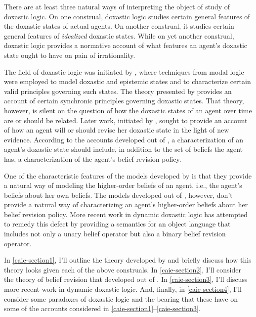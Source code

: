 

There are at least three natural ways of interpreting the object of study of doxastic logic.
On one construal, doxastic logic studies certain general features of the doxastic states of actual agents. 
On another construal, it studies certain general features of \textit{idealized} doxastic states.
While on yet another construal, doxastic logic provides a normative account of what features an agent's doxastic state ought to have on pain of irrationality.

The field of doxastic logic was initiated by \citet{Hintikka1}, where techniques from modal logic were employed to model  doxastic and epistemic states and to characterize certain valid principles governing such states.
The theory presented by \citeauthor{Hintikka1} provides an account of certain synchronic principles governing doxastic states.
That theory, however, is silent on the question of how the doxastic states of an agent over time are or should be related.
Later work, initiated by \citet{AGM}, sought to provide an account of how an agent will or should revise her doxastic state in the light of new evidence.
According to the accounts developed out of \citeauthor{AGM}, a characterization of an agent's doxastic state should include, in addition to the set of beliefs the agent has, a characterization of the agent's belief revision policy. 

One of the characteristic features of the models developed by \citeauthor{Hintikka1} is that they provide a natural way of modeling the higher-order beliefs of an agent, i.e., the agent's beliefs about her own beliefs.
The models developed out of \citeauthor{AGM}, however, don't provide a natural way of characterizing an agent's higher-order beliefs about her belief revision policy.
More recent work in dynamic doxastic logic has attempted to remedy this defect by providing a semantics for an object language that includes not only a unary belief operator but also a binary belief revision operator.

In \autoref{caie-section1}, I'll outline the theory developed by \citeauthor{Hintikka1} and briefly discuss how this theory looks given each of the above construals.
In \autoref{caie-section2}, I'll consider the theory of belief revision that developed out of \citeauthor{AGM}.
In \autoref{caie-section3}, I'll discuss more recent work in dynamic doxastic logic.
And, finally, in \autoref{caie-section4}, I'll consider some paradoxes of doxastic logic and the bearing that these have on some of the accounts considered in \autoref{caie-section1}--\ref{caie-section3}.



